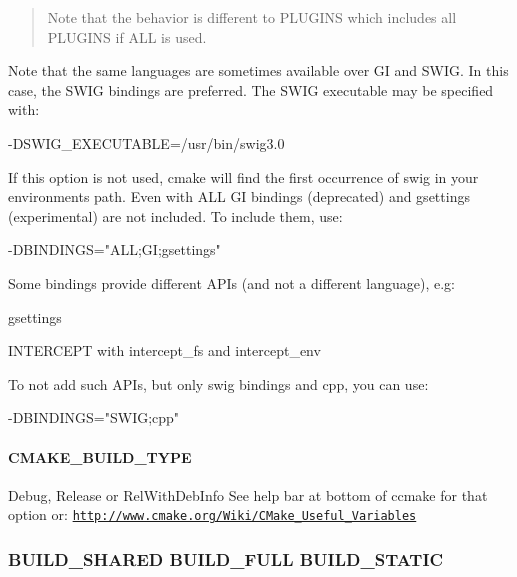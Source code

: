 \begin{quote}
Note that the behavior is different to P\+L\+U\+G\+I\+NS which includes all P\+L\+U\+G\+I\+NS if A\+LL is used. \end{quote}


Note that the same languages are sometimes available over GI and S\+W\+IG. In this case, the S\+W\+IG bindings are preferred. The S\+W\+IG executable may be specified with\+: \begin{DoxyVerb}-DSWIG_EXECUTABLE=/usr/bin/swig3.0
\end{DoxyVerb}


If this option is not used, cmake will find the first occurrence of {\ttfamily swig} in your environment\textquotesingle{}s path. Even with {\ttfamily A\+LL} GI bindings (deprecated) and gsettings (experimental) are not included. To include them, use\+: \begin{DoxyVerb}-DBINDINGS="ALL;GI;gsettings"
\end{DoxyVerb}


Some bindings provide different A\+P\+Is (and not a different language), e.\+g\+:


\begin{DoxyItemize}
\item {\ttfamily gsettings}
\item {\ttfamily I\+N\+T\+E\+R\+C\+E\+PT} with {\ttfamily intercept\+\_\+fs} and {\ttfamily intercept\+\_\+env}
\end{DoxyItemize}

To not add such A\+P\+Is, but only {\ttfamily swig} bindings and {\ttfamily cpp}, you can use\+: \begin{DoxyVerb}-DBINDINGS="SWIG;cpp"
\end{DoxyVerb}


\paragraph*{C\+M\+A\+K\+E\+\_\+\+B\+U\+I\+L\+D\+\_\+\+T\+Y\+PE}

{\ttfamily Debug}, {\ttfamily Release} or {\ttfamily Rel\+With\+Deb\+Info} See help bar at bottom of ccmake for that option or\+: \href{http://www.cmake.org/Wiki/CMake_Useful_Variables}{\tt http\+://www.\+cmake.\+org/\+Wiki/\+C\+Make\+\_\+\+Useful\+\_\+\+Variables}

\subsubsection*{B\+U\+I\+L\+D\+\_\+\+S\+H\+A\+R\+ED B\+U\+I\+L\+D\+\_\+\+F\+U\+LL B\+U\+I\+L\+D\+\_\+\+S\+T\+A\+T\+IC}

